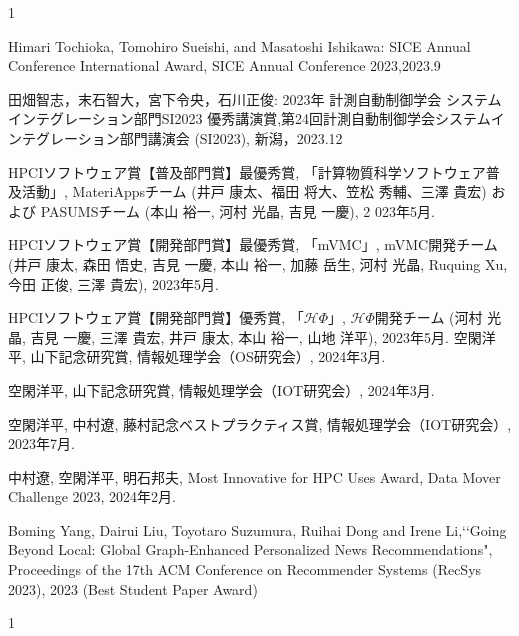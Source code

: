 \begin{受賞}{1}

Himari Tochioka, Tomohiro Sueishi, and Masatoshi Ishikawa: SICE Annual Conference International Award, SICE Annual Conference 2023,2023.9

田畑智志，末石智大，宮下令央，石川正俊: 2023年 計測自動制御学会 システムインテグレーション部門SI2023 優秀講演賞,第24回計測自動制御学会システムインテグレーション部門講演会 (SI2023), 新潟，2023.12

HPCIソフトウェア賞【普及部門賞】最優秀賞, 
「計算物質科学ソフトウェア普及活動」, 
MateriAppsチーム (井戸 康太、福田 将大、笠松 秀輔、三澤 貴宏) および PASUMSチーム (本山 裕一, 河村 光晶, 吉見 一慶), 2
023年5月.

HPCIソフトウェア賞【開発部門賞】最優秀賞,
「mVMC」, 
mVMC開発チーム (井戸 康太, 森田 悟史, 吉見 一慶, 本山 裕一, 加藤 岳生, 河村 光晶, Ruquing Xu, 今田 正俊, 三澤 貴宏), 
2023年5月.

HPCIソフトウェア賞【開発部門賞】優秀賞, 
「$\mathcal{H}\Phi$」, 
$\mathcal{H}\Phi$開発チーム (河村 光晶, 吉見 一慶, 三澤 貴宏, 井戸 康太, 本山 裕一, 山地 洋平), 
2023年5月.
空閑洋平, 山下記念研究賞, 情報処理学会（OS研究会）, 2024年3月.

空閑洋平, 山下記念研究賞, 情報処理学会（IOT研究会）, 2024年3月.

空閑洋平, 中村遼, 藤村記念ベストプラクティス賞, 情報処理学会（IOT研究会）, 2023年7月.

中村遼, 空閑洋平, 明石邦夫, Most Innovative for HPC Uses Award, Data Mover Challenge 2023, 2024年2月.



Boming Yang, Dairui Liu, Toyotaro Suzumura, Ruihai Dong and Irene Li,\lq\lq Going Beyond Local: Global Graph-Enhanced Personalized News Recommendations", Proceedings of the 17th ACM Conference on Recommender Systems  (RecSys 2023), 2023 (Best Student Paper Award)

\end{受賞}

\begin{著書}{1}






\end{著書}

